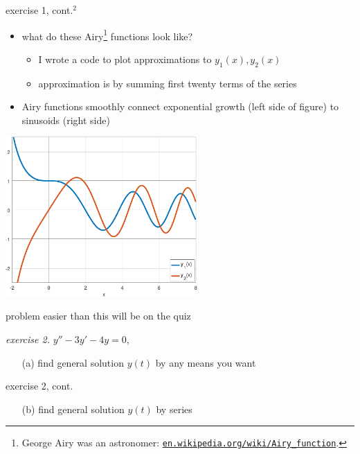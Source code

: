 \documentclass[urlcolor=blue,dvipsnames]{beamer}
\begin{document}
\begin{frame}{exercise 1, cont.$^2$}

\begin{itemize}
\item what do these Airy\footnote{George Airy was an astronomer: \href{https://en.wikipedia.org/wiki/Airy_function}{\scriptsize \texttt{en.wikipedia.org/wiki/Airy\_function}}.} functions look like?
    \begin{itemize}
    \item I wrote a code to plot approximations to $y_1(x),y_2(x)$
    \item approximation is by summing first twenty terms of the series
    \end{itemize}
\item Airy functions smoothly connect exponential growth (left side of figure) to sinusoids (right side)
\end{itemize}

\begin{center}
\includegraphics[width=0.55\textwidth]{figs/airyplots}
\end{center}
\end{frame}


\begin{frame}{problem easier than this will be on the quiz}

\noindent \emph{exercise 2.}  \qquad $y''-3y'-4y=0$,

\begin{itemize}
\item[(a)] find general solution $y(t)$ by any means you want
\end{itemize}

\vspace{50mm}
\end{frame}


\begin{frame}{exercise 2, cont.}

\begin{itemize}
\item[(b)] find general solution $y(t)$ by series
\end{itemize}

\vspace{60mm}
\end{frame}
\end{document}
